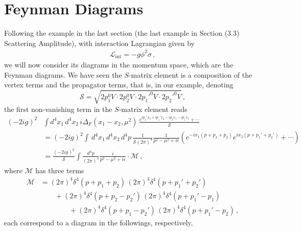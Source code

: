\documentclass[11pt, onesided]{book}
\theoremstyle{break}
\theoremstyle{break}
\begin{document}
\section[Feynman Diagrams]{\color{red} Feynman Diagrams\color{black}}
Following the example in the last section (the last example in Section (3.3) Scattering Amplitude), with interaction Lagrangian given by
\begin{align*}
\mathcal{L}_{\text{int}} = -g\phi^2\sigma\,,
\end{align*}
we will now consider its diagrams in the momentum space, which are the Feynman diagrams. We have seen the $S$-matrix element is a composition of the vertex terms and the propagator terms, that is, in our example, denoting $$\mathcal{S} = \sqrt{2p_1^0V\cdot 2p_2^0V \cdot 2p_1'^0 V \cdot 2p_2'^0V}\,,$$ the first non-vanishing term in the $S$-matrix element reads
\begin{align*}
(-2ig)^2&\int d^4x_1\, d^4x_2\, i\Delta_F(x_1-x_2,\mu^2)\, \frac{e^{ip_2'x_2+ip_1'x_2 -ip_2x_1 - ip_1x_1}+\cdots }{\mathcal{S}}\\
&= (-2ig)^2 \int \, d^4x_1\, d^4x_2\,d^4p\,\frac{1}{\mathcal{S}(2\pi)^4}\frac{1}{p^2 - \mu^2 + i\epsilon}
\left(e^{-ix_1(p + p_1 + p_2)}e^{ix_2(p+p_1' + p_2')}+\cdots \right)\\
&= \frac{(-2ig)^2}{\mathcal{S} }\int \frac{d^4p}{(2\pi)^4}\frac{i}{p^2 - \mu^2 + i\epsilon}\cdot \mathcal{M}\,,
\end{align*}
where $\mathcal{M}$ has three terms
\begin{align*}
\mathcal{M} &= (2\pi)^4\delta^4(p+p_1+p_2)\,(2\pi)^4 \delta^4(p+p_1' + p_2') \\
&{}\qquad +  (2\pi)^4 \delta^4(p + p_2 - p_2')\,(2\pi)^4\delta^4(p+p_1'-p_1)\\
&{}\qquad\qquad + (2\pi)^4 \delta^4(p+p_1 - p_2')\,(2\pi)^4\delta^4(p+p_1' - p_2) \,,
\end{align*}
each correspond to a diagram in the followings, respectively,\\
\end{document}
